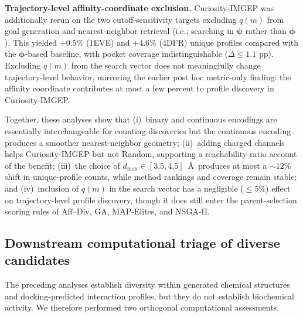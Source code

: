 \documentclass[journal=jcisd8,manuscript=article]{achemso}
\begin{document}
\textbf{Trajectory-level affinity-coordinate exclusion.} Curiosity-IMGEP was additionally rerun on the two cutoff-sensitivity targets excluding $q(m)$ from goal generation and nearest-neighbor retrieval (i.e., searching in $\boldsymbol{\psi}$ rather than $\boldsymbol{\phi}$). This yielded $+0.5\%$ (1EVE) and $+4.6\%$ (4DFR) unique profiles compared with the $\boldsymbol{\phi}$-based baseline, with pocket coverage indistinguishable ($\Delta \leq 1.1$ pp). Excluding $q(m)$ from the search vector does not meaningfully change trajectory-level behavior, mirroring the earlier post hoc metric-only finding: the affinity coordinate contributes at most a few percent to profile discovery in Curiosity-IMGEP.

Together, these analyses show that (i)~binary and continuous encodings are essentially interchangeable for counting discoveries but the continuous encoding produces a smoother nearest-neighbor geometry; (ii)~adding charged channels helps Curiosity-IMGEP but not Random, supporting a reachability-ratio account of the benefit; (iii)~the choice of $d_{\max} \in [3.5, 4.5]$~\AA\ produces at most a $\sim 12\%$ shift in unique-profile counts, while method rankings and coverage remain stable; and (iv)~inclusion of $q(m)$ in the search vector has a negligible ($\leq 5\%$) effect on trajectory-level profile discovery, though it does still enter the parent-selection scoring rules of Aff--Div, GA, MAP-Elites, and NSGA-II.

\subsection{Downstream computational triage of diverse candidates}
\label{sec:downstream}

The preceding analyses establish diversity within generated chemical structures and docking-predicted interaction profiles, but they do not establish biochemical activity. We therefore performed two orthogonal computational assessments.
\end{document}
